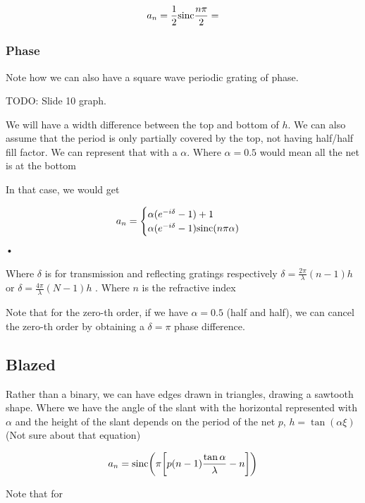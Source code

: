 \documentclass[../main/main.tex]{subfiles}
\begin{document}
\begin{equation}
a_{n} = \frac 1 2 \textrm{sinc} \frac {n \pi } 2 =
\end{equation}

\subsubsection{Phase}

Note how we can also have a square wave periodic grating of phase.

TODO: Slide 10 graph.

We will have a width difference between the top and bottom of $h$. We can also assume that the period is only partially covered by the top, not having half/half fill factor. We can represent that with a $\alpha$. Where $\alpha = 0.5$ would mean all the net is at the bottom

In that case, we would get

\begin{equation}
a_{n}=\begin{cases}
\alpha (e^{-i \delta} - 1) + 1\\
\alpha (e^{-i \delta} - 1) \textrm{sinc} (n \pi \alpha)\\
\end{cases}
\end{equation}•

Where  $\delta$ is for transmission and reflecting gratings respectively $\delta = \frac{2 \pi}{\lambda} (n - 1) h $ or  $\delta = \frac{4 \pi}{\lambda} (N - 1) h $ . Where $n$ is the refractive index

Note that for the zero-th order, if we have $\alpha  = 0.5 $ (half and half), we can cancel the zero-th order by obtaining a $\delta = \pi$ phase difference.

\subsection{Blazed}
Rather than a binary, we can have edges drawn in triangles, drawing a sawtooth shape. Where we have the angle of the slant with the horizontal represented with $\alpha$ and the height of the slant depends on the period of the net $p$, $h = \tan(\alpha \xi)$ (Not sure about that equation)

\begin{equation}
a_{n} = \textrm{sinc} \qty(\pi \qty[p(n-1) \frac {\tan \alpha} { \lambda} - n])
\end{equation}

Note that for
\end{document}
